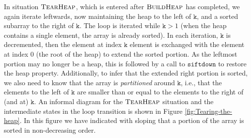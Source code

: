 \documentclass[english,submission]{eptcs}
\begin{document}
In situation $\textsc{TearHeap}$, which is entered after $\textsc{BuildHeap}$
has completed, we again iterate leftwards, now maintaining the heap
to the left of $\mathtt{k}$, and a sorted subarray to the right of
$\mathtt{k}$. The loop is iterated while $\mathtt{k}>1$ (when the
heap contains a single element, the array is already sorted). In each
iteration, $\mathtt{k}$ is decremented, then the element at index
$\mathtt{k}$ element is exchanged with the element at index $0$
(the root of the heap) to extend the sorted portion. As the leftmost
portion may no longer be a heap, this is followed by a call to $\mathtt{siftdown}$
to restore the heap property. Additionally, to infer that the extended
right portion is sorted, we also need to know that the array is \emph{partitioned}
around $\mathtt{k}$, i.e., that the elements to the left of $\mathtt{k}$
are smaller than or equal to the elements to the right of (and at)
$\mathtt{k}$. An informal diagram for the $\textsc{TearHeap}$ situation
and the intermediate states in the loop transition is shown in Figure
\ref{fig:Tearing-the-heap}. In this figure we have indicated with
sloping that a portion of the array is sorted in non-decreasing order.
\end{document}
